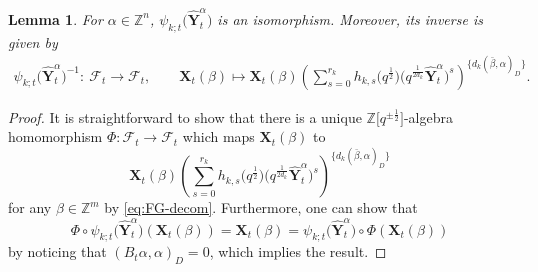 \documentclass[11pt]{article}
\numberwithin{equation}{section}
\newcommand{\Z}{\mathbb{Z}}
\numberwithin{equation}{section}
\newtheorem{Lemma}[Theorem]{Lemma}
\begin{document}
\begin{Lemma}
 For $\alpha\in \Z^n$, $\psi_{k;t}\bigl(\mathbf{\hat{Y}}_{t}^{\alpha}\bigr)$ is an isomorphism. Moreover, its inverse is given by
 \begin{align*}
 \psi_{k;t}\bigl(\mathbf{\hat{Y}}_{t}^{\alpha}\bigr)^{-1}\colon\ \mathcal{F}_t\to \mathcal{F}_t,\qquad
 \mathbf{X}_{t}(\beta)\mapsto\mathbf{X}_{t}(\beta)\left(\sum\limits_{s=0}^{r_k} h_{k,s}\bigl(q^{\frac{1}{2}}\bigr)\bigl(q^{\frac{1}{2d_{k}}}\mathbf{\hat{Y}}_{t}^{\alpha}\bigr)^{s}\right)^{\{d_{k}(\bar{\beta},\alpha)_D\}}.
\end{align*}
\end{Lemma}
\begin{proof}
 It is straightforward to show that there is a unique $\Z\big[q^{\pm\frac{1}{2}}\big]$-algebra homomorphism $\Phi\colon \mathcal{F}_t\to \mathcal{F}_t$ which maps $\mathbf{X}_t(\beta)$ to
 \[
 \mathbf{X}_{t}(\beta)\left(\sum\limits_{s=0}^{r_k} h_{k,s}\bigl(q^{\frac{1}{2}}\bigr)\bigl(q^{\frac{1}{2d_{k}}}\mathbf{\hat{Y}}_{t}^{\alpha}\bigr)^{s}\right)^{\{d_{k}(\bar{\beta},\alpha)_D\}}
 \]
  for any $\beta\in \Z^m$ by \eqref{eq:FG-decom}.
 Furthermore, one can show that
 \[
 \Phi\circ \psi_{k;t}\bigl(\mathbf{\hat{Y}}_{t}^{\alpha}\bigr)(\mathbf{X}_t(\beta))=\mathbf{X}_t(\beta)=\psi_{k;t}\bigl(\mathbf{\hat{Y}}_{t}^{\alpha}\bigr)\circ \Phi(\mathbf{X}_t(\beta))
 \]
 by noticing that $(B_t\alpha, \alpha)_D=0$, which implies the result.
\end{proof}
\end{document}
